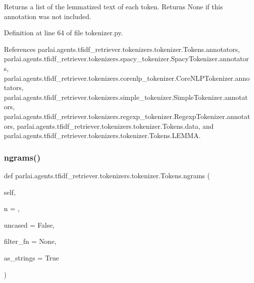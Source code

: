 \begin{DoxyVerb}Returns a list of the lemmatized text of each token.
Returns None if this annotation was not included.
\end{DoxyVerb}
 

Definition at line 64 of file tokenizer.\+py.



References parlai.\+agents.\+tfidf\+\_\+retriever.\+tokenizers.\+tokenizer.\+Tokens.\+annotators, parlai.\+agents.\+tfidf\+\_\+retriever.\+tokenizers.\+spacy\+\_\+tokenizer.\+Spacy\+Tokenizer.\+annotators, parlai.\+agents.\+tfidf\+\_\+retriever.\+tokenizers.\+corenlp\+\_\+tokenizer.\+Core\+N\+L\+P\+Tokenizer.\+annotators, parlai.\+agents.\+tfidf\+\_\+retriever.\+tokenizers.\+simple\+\_\+tokenizer.\+Simple\+Tokenizer.\+annotators, parlai.\+agents.\+tfidf\+\_\+retriever.\+tokenizers.\+regexp\+\_\+tokenizer.\+Regexp\+Tokenizer.\+annotators, parlai.\+agents.\+tfidf\+\_\+retriever.\+tokenizers.\+tokenizer.\+Tokens.\+data, and parlai.\+agents.\+tfidf\+\_\+retriever.\+tokenizers.\+tokenizer.\+Tokens.\+L\+E\+M\+MA.

\mbox{\label{classparlai_1_1agents_1_1tfidf__retriever_1_1tokenizers_1_1tokenizer_1_1Tokens_ae66797d00194acc3c67b42c7cf17dabf}} 
\subsubsection{\texorpdfstring{ngrams()}{ngrams()}}
{\footnotesize\ttfamily def parlai.\+agents.\+tfidf\+\_\+retriever.\+tokenizers.\+tokenizer.\+Tokens.\+ngrams (\begin{DoxyParamCaption}\item[{}]{self,  }\item[{}]{n = {},  }\item[{}]{uncased = {\ttfamily False},  }\item[{}]{filter\+\_\+fn = {\ttfamily None},  }\item[{}]{as\+\_\+strings = {\ttfamily True} }\end{DoxyParamCaption})}

